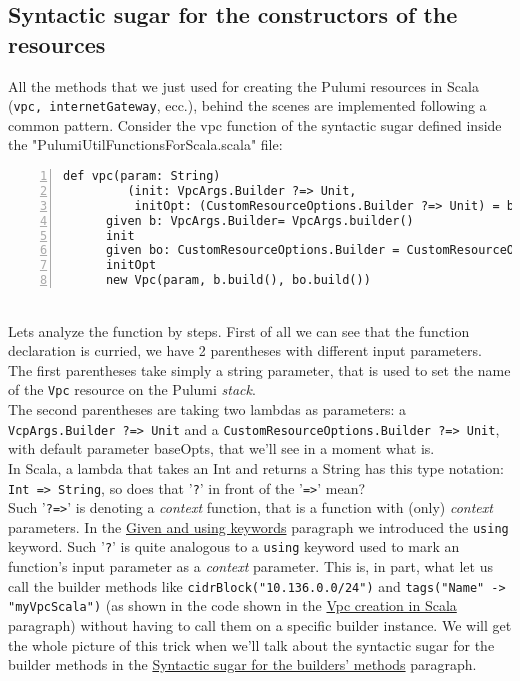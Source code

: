 \subsection{Syntactic sugar for the constructors of the resources}
All the methods that we just used for creating the Pulumi resources in Scala (\texttt{vpc, internetGateway}, ecc.), behind the scenes are implemented following a common pattern.
Consider the vpc function of the syntactic sugar defined inside the "PulumiUtilFunctionsForScala.scala" file:
\begin{lstlisting}[numbers=left, numberstyle=\tiny, numbersep=-5pt, stepnumber=1]
  def vpc(param: String)
         (init: VpcArgs.Builder ?=> Unit,
          initOpt: (CustomResourceOptions.Builder ?=> Unit) = baseOpts): Vpc =
	  given b: VpcArgs.Builder= VpcArgs.builder()
	  init
	  given bo: CustomResourceOptions.Builder = CustomResourceOptions.builder()
	  initOpt
	  new Vpc(param, b.build(), bo.build())
\end{lstlisting}\mbox{}\\
Lets analyze the function by steps.
First of all we can see that the function declaration is curried, we have 2 parentheses with different input parameters.\\
The first parentheses take simply a string parameter, that is used to set the name of the \texttt{Vpc} resource on the Pulumi \textit{stack}.\\
The second parentheses are taking two lambdas as parameters: a \texttt{VcpArgs.Builder ?=> Unit}  and a \texttt{CustomResourceOptions.Builder ?=> Unit}, with default parameter baseOpts, that we'll see in a moment what is.\\
In Scala, a lambda that takes an Int and returns a String has this type notation: \texttt{Int => String}, so does that '\texttt{?}' in front of the '\texttt{=>}' mean?\\
Such '\texttt{?=>}' is denoting a \textit{context} function, that is a function with (only) \textit{context} parameters.
In the \hyperref[par:given-using]{Given and using keywords} paragraph we introduced the \texttt{using} keyword.
Such '\texttt{?}' is quite analogous to a \texttt{using} keyword used to mark an function's input parameter as a \textit{context} parameter.
This is, in part, what let us call the builder methods like \texttt{cidrBlock("10.136.0.0/24")} and \texttt{tags("Name" -> "myVpcScala")} (as shown in the code shown in the \hyperref[sssec:vpc-creation-scala]{Vpc creation in Scala} paragraph)
without having to call them on a specific builder instance.
We will get the whole picture of this trick when we'll talk about the syntactic sugar for the builder methods in the \hyperref[ssec:syn-sug-builders]{Syntactic sugar for the builders' methods} paragraph.

